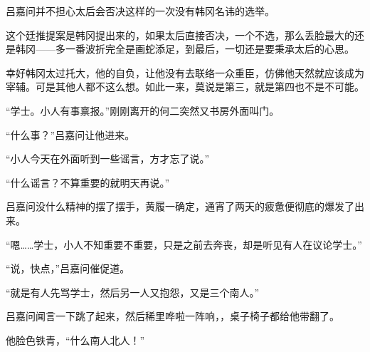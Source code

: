 吕嘉问并不担心太后会否决这样的一次没有韩冈名讳的选举。

这个廷推提案是韩冈提出来的，如果太后直接否决，一个不选，那么丢脸最大的还是韩冈——多一番波折完全是画蛇添足，到最后，一切还是要秉承太后的心思。

幸好韩冈太过托大，他的自负，让他没有去联络一众重臣，仿佛他天然就应该成为宰辅。可是其他人都不这么想。如此一来，莫说是第三，就是第四也不是不可能。

“学士。小人有事禀报。”刚刚离开的何二突然又书房外面叫门。

“什么事？”吕嘉问让他进来。

“小人今天在外面听到一些谣言，方才忘了说。”

“什么谣言？不算重要的就明天再说。”

吕嘉问没什么精神的摆了摆手，黄履一确定，通宵了两天的疲惫便彻底的爆发了出来。

“嗯……学士，小人不知重要不重要，只是之前去奔丧，却是听见有人在议论学士。”

“说，快点，”吕嘉问催促道。

“就是有人先骂学士，然后另一人又抱怨，又是三个南人。”

吕嘉问闻言一下跳了起来，然后稀里哗啦一阵响，，桌子椅子都给他带翻了。

他脸色铁青，“什么南人北人！”

